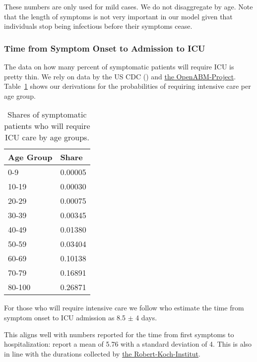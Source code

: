 These numbers are only used for mild cases. We do not disaggregate by age. Note that the
length of symptoms is not very important in our model given that individuals stop being
infectious before their symptoms cease.


\subsubsection{Time from Symptom Onset to Admission to ICU}

The data on how many percent of symptomatic patients will require ICU is pretty thin. We
rely on data by the US CDC (\citet{Stokes2020}) and \href{https://bit.ly/3yKXFyu}{the
OpenABM-Project}. Table~\ref{tab:symptomatic-to-ICU} shows our derivations for the
probabilities of requiring intensive care per age group.

\begin{table}[tb]
    \caption{Shares of symptomatic patients who will require ICU care by age groups.}
    \label{tab:symptomatic-to-ICU}
    \centering

    \begin{tabular}{ll}
        \toprule
        Age Group & Share \\
        \midrule
        0-9 & 0.00005 \\
        10-19 & 0.00030 \\
        20-29 & 0.00075 \\
        30-39 & 0.00345 \\
        40-49 & 0.01380 \\
        50-59 & 0.03404 \\
        60-69 & 0.10138 \\
        70-79 & 0.16891 \\
        80-100 & 0.26871 \\
        \bottomrule
    \end{tabular}


\end{table}

For those who will require intensive care we follow \citet{Chen2020} who estimate the
time from symptom onset to ICU admission as 8.5 $\pm$ 4 days.

This aligns well with numbers reported for the time from first symptoms to
hospitalization: \citet{Gaythorpe2020} report a mean of 5.76 with a standard deviation
of 4. This is also in line with the durations collected by
\href{https://www.rki.de/DE/Content/InfAZ/N/Neuartiges_Coronavirus/Steckbrief.html#doc13776792bodyText16}{the
Robert-Koch-Institut}.

